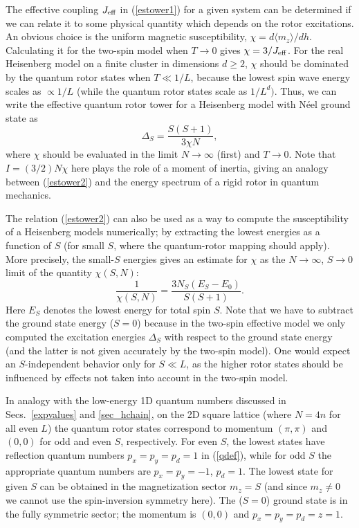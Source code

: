 \documentclass[draft,numberedheadings]{aipproc}
\begin{document}
The effective coupling $J_{\rm eff}$ in (\ref{estower1}) for a given system can be determined if we can relate it to some physical quantity which 
depends on the rotor excitations. An obvious choice is the uniform magnetic susceptibility, $\chi=d\langle m_z\rangle/dh$. Calculating it for
the two-spin model when $T\to 0$ gives $\chi=3/J_{\rm eff}$. For the real Heisenberg model on a finite cluster in dimensions $d\ge 2$, $\chi$ 
should be dominated by the quantum rotor states when $T \ll 1/L$, because the lowest spin wave energy scales as $\propto 1/L$ (while the quantum 
rotor states scale as $1/L^d)$. Thus, we can write the effective quantum rotor tower for a Heisenberg model with N\'eel 
ground state as
\begin{equation}
\Delta_S=\frac{S(S+1)}{3\chi N},
\label{estower2}
\end{equation}
where $\chi$ should be evaluated in the limit $N\to \infty$ (first) and  $T\to 0$. Note that $I=(3/2)N\chi$ here plays the role of a moment of inertia, 
giving an analogy between (\ref{estower2}) and the energy spectrum of a rigid rotor in quantum mechanics. 

The relation (\ref{estower2}) can also be used as a way to compute the susceptibility of a Heisenberg models numerically; by extracting the lowest energies
as a function of $S$ (for small $S$, where the quantum-rotor mapping should apply). More precisely, the small-$S$ energies gives an estimate for $\chi$ 
as the $N\to \infty$, $S\to 0$ limit of the quantity $\chi(S,N)$:
\begin{equation}
\frac{1}{\chi(S,N)}=\frac{3N_S(E_S-E_0)}{S(S+1)}.
\label{estower3}
\end{equation}
Here $E_S$ denotes the lowest energy for total spin $S$. Note that we have to subtract the ground state energy ($S=0$) because in the two-spin effective 
model we only computed the excitation energies $\Delta_S$ with respect to the ground state energy (and the latter is not given accurately by the two-spin model). 
One would expect an $S$-independent behavior only for $S \ll L$, as the higher rotor states should be influenced by effects not taken into account 
in the two-spin model.

In analogy with the low-energy 1D quantum numbers discussed in Secs.~\ref{expvalues} and \ref{sec_hchain}, on the 2D square lattice (where $N=4n$ for all
even $L$) the quantum rotor states correspond to momentum $(\pi,\pi)$ and $(0,0)$ for odd and even $S$, respectively. For even $S$, the lowest states have 
reflection quantum numbers $p_x=p_y=p_d=1$ in (\ref{qdef}), while for odd $S$ the appropriate quantum numbers are $p_x=p_y=-1$, $p_d=1$. The lowest 
state for given $S$ can be obtained in the magnetization sector $m_z=S$ (and since $m_z\not=0$ we cannot use the spin-inversion symmetry here). 
The ($S=0$) ground state is in the fully symmetric sector; the momentum is $(0,0)$ and $p_x=p_y=p_d=z=1$.
\end{document}
